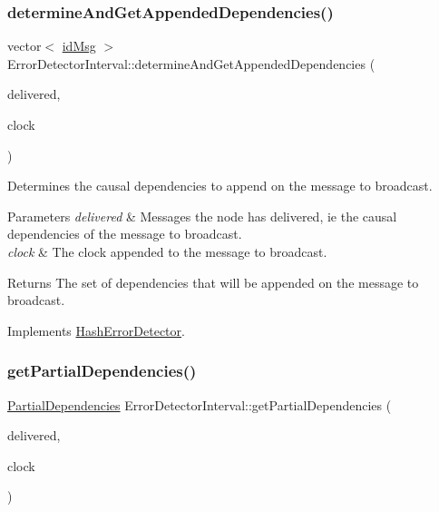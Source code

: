 \subsubsection{\texorpdfstring{determine\+And\+Get\+Appended\+Dependencies()}{determineAndGetAppendedDependencies()}}
{\footnotesize\ttfamily vector$<$ \hyperlink{structures_8h_a83a1d9a070efa5341da84cfd8e28d3e5}{id\+Msg} $>$ Error\+Detector\+Interval\+::determine\+And\+Get\+Appended\+Dependencies (\begin{DoxyParamCaption}\item[{const vector$<$ \hyperlink{structures_8h_a7e7bdc1d2fff8a9436f2f352b2711ed6}{message\+Info} $>$ \&}]{delivered,  }\item[{const \hyperlink{class_probabilistic_clock}{Probabilistic\+Clock} \&}]{clock }\end{DoxyParamCaption})\hspace{0.3cm}{\ttfamily [virtual]}}



Determines the causal dependencies to append on the message to broadcast. 


\begin{DoxyParams}{Parameters}
{\em delivered} & Messages the node has delivered, ie the causal dependencies of the message to broadcast. \\
\hline
{\em clock} & The clock appended to the message to broadcast. \\
\hline
\end{DoxyParams}
\begin{DoxyReturn}{Returns}
The set of dependencies that will be appended on the message to broadcast. 
\end{DoxyReturn}


Implements \hyperlink{class_hash_error_detector_ae45353331e29b50a0aa2fc6dd540ed4e}{Hash\+Error\+Detector}.

\mbox{\label{class_error_detector_interval_a9494a918f551eb1efcab39ffd68316d6}} 
\subsubsection{\texorpdfstring{get\+Partial\+Dependencies()}{getPartialDependencies()}}
{\footnotesize\ttfamily \hyperlink{class_partial_dependencies}{Partial\+Dependencies} Error\+Detector\+Interval\+::get\+Partial\+Dependencies (\begin{DoxyParamCaption}\item[{const vector$<$ \hyperlink{structures_8h_a7e7bdc1d2fff8a9436f2f352b2711ed6}{message\+Info} $>$ \&}]{delivered,  }\item[{const \hyperlink{class_probabilistic_clock}{Probabilistic\+Clock} \&}]{clock }\end{DoxyParamCaption})\hspace{0.3cm}{\ttfamily [virtual]}}



